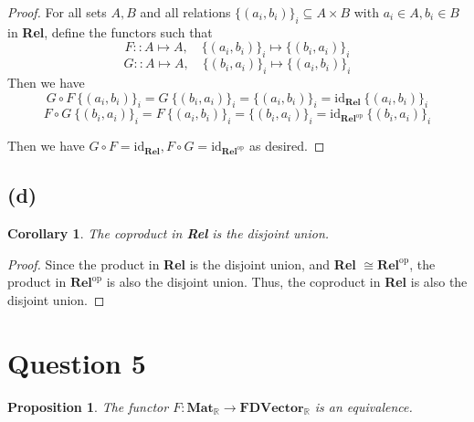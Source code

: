 \documentclass[11pt]{article} %
\newtheorem{corollary}[theorem]{Corollary}
\newtheorem{proposition}[theorem]{Proposition}
\theoremstyle{definition}
\begin{document}
\begin{proof}
  For all sets $A,B$ and all relations $\{(a_i,b_i)\}_i \subseteq A\times B$ 
  with $a_i \in A, b_i \in B$ in \textbf{Rel},
  define the functors such that
  \[F:: A\mapsto A,\quad \{(a_i,b_i)\}_i \mapsto \{(b_i,a_i)\}_i\]
  \[G:: A\mapsto A,\quad \{(b_i,a_i)\}_i \mapsto \{(a_i,b_i)\}_i\]
  Then we have
  \[G \circ F\ \{(a_i,b_i)\}_i = G\ \{(b_i,a_i)\}_i = \{(a_i,b_i)\}_i = \text{id}_{\textbf{Rel}}\ \{(a_i,b_i)\}_i\]
  \[F \circ G\ \{(b_i,a_i)\}_i = F\ \{(a_i,b_i)\}_i = \{(b_i,a_i)\}_i 
  = \text{id}_{\textbf{Rel}^{\text{op}}}\ \{(b_i,a_i)\}_i\]


  Then we have $G\circ F = \text{id}_{\textbf{Rel}}, F\circ G = \text{id}_{\textbf{Rel}^{\text{op}}}$ as desired.
\end{proof}

\subsection*{(d)}
\begin{corollary}
  The coproduct in \textbf{Rel} is the disjoint union.
\end{corollary}
\begin{proof}
  Since the product in \textbf{Rel} is the disjoint union, and \textbf{Rel} $\cong\textbf{Rel}^{\text{op}}$,
  the product in $\textbf{Rel}^{\text{op}}$ is also the disjoint union.
  Thus, the coproduct in \textbf{Rel} is also the disjoint union.
\end{proof}

\section*{Question 5}
\addtocounter{section}{1}
\begin{proposition}
  The functor $F:\textbf{Mat}_{\mathbb{R}}\rightarrow \textbf{FDVector}_{\mathbb{R}}$ is an equivalence.
\end{proposition}
\end{document}
